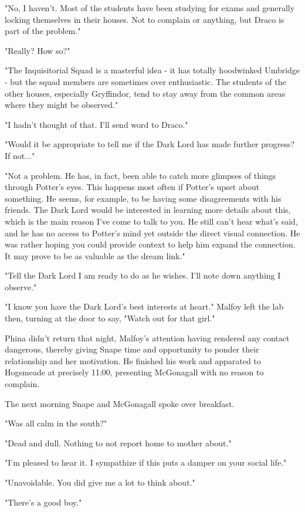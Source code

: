 \documentclass[a4paper,11pt]{article}
\begin{document}
"No, I haven't. Most of the students have been studying for exams and generally locking themselves in their houses. Not to complain or anything, but Draco is part of the problem."

"Really? How so?"

"The Inquisitorial Squad is a masterful idea - it has totally hoodwinked Umbridge - but the squad members are sometimes over enthusiastic. The students of the other houses, especially Gryffindor, tend to stay away from the common areas where they might be observed."

"I hadn't thought of that. I'll send word to Draco."

"Would it be appropriate to tell me if the Dark Lord has made further progress? If not..."

"Not a problem. He has, in fact, been able to catch more glimpses of things through Potter's eyes. This happens most often if Potter's upset about something. He seems, for example, to be having some disagreements with his friends. The Dark Lord would be interested in learning more details about this, which is the main reason I've come to talk to you. He still can't hear what's said, and he has no access to Potter's mind yet outside the direct visual connection. He was rather hoping you could provide context to help him expand the connection. It may prove to be as valuable as the dream link."

"Tell the Dark Lord I am ready to do as he wishes. I'll note down anything I observe."

"I know you have the Dark Lord's best interests at heart." Malfoy left the lab then, turning at the door to say, "Watch out for that girl."

Phina didn't return that night, Malfoy's attention having rendered any contact dangerous, thereby giving Snape time and opportunity to ponder their relationship and her motivation. He finished his work and apparated to Hogsmeade at precisely 11:00, presenting McGonagall with no reason to complain.

The next morning Snape and McGonagall spoke over breakfast.

"Was all calm in the south?"

"Dead and dull. Nothing to not report home to mother about."

"I'm pleased to hear it. I sympathize if this puts a damper on your social life."

"Unavoidable. You did give me a lot to think about."

"There's a good boy."
\end{document}
